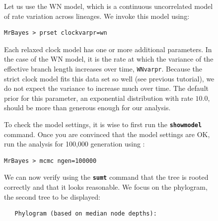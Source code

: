 \documentclass[12pt]{book}
\newcommand{\ttt}[1]{\texttt{#1}}
\newcommand{\tb}[1]{\ttt{\textbf{#1}}}
\begin{document}
\begin{figure}[h]
Let us use the WN model, which is a continuous uncorrelated model of rate variation across lineages. We invoke this model using:

\small
\begin{singlespacing}
\begin{verbatim}
MrBayes > prset clockvarpr=wn
\end{verbatim}
\end{singlespacing}
\normalsize

Each relaxed clock model has one or more additional parameters. In the case of the WN model, it is
the rate at which the variance of the effective branch length increases over time, \ttt{WNvarpr}.
Because the strict clock model fits this data set so well (see previous tutorial), we do not expect
the variance to increase much over time. The default prior for this parameter, an exponential
distribution with rate $10.0$, should be more than generous enough for our analysis.

To check the model settings, it is wise to first run the \tb{showmodel} command. Once you are
convinced that the model settings are OK, run the analysis for 100,000 generation using :

\small
\begin{singlespacing}
\begin{verbatim}
MrBayes > mcmc ngen=100000
\end{verbatim}
\end{singlespacing}
\normalsize

We can now verify using the \tb{sumt} command that the tree is rooted correctly and that it
looks reasonable. We focus on the phylogram, the second tree to be displayed:

\scriptsize
\begin{singlespacing}
\begin{verbatim}
   Phylogram (based on median node depths):


\end{verbatim}
\end{singlespacing}
\end{figure}
\end{document}
